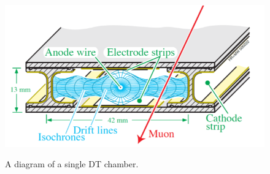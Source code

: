 \begin{figure}[H]
    \centering
    {\includegraphics[width=1\textwidth]{Images/CMS/DTDiagram.png}}
    \caption{A diagram of a single DT chamber.}
    \label{fig:DTDiagram}
\end{figure}
